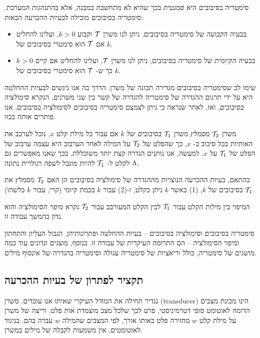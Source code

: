 {סימטריה בסיבובים היא
\emph{סמנטית}
בכך שהיא לא מתחשבת במבנה, אלא בהתנהגות המערכת.
סימטריה בסיבובים מובילה לבעיות ההכרעה הבאות:
\begin{itemize}
\item
בבעיה 
\emph{הקבועה}
של סימטריה בסיבובים, 
ניתן לנו משרן
$\mathcal{T}$ וקבוע $k>0$,
ועלינו להחליט אם
$\mathcal{T}$ 
הוא סימטרי בסיבובים של
$k$.
\item
בבעיה 
\emph{הקיומית}
של סימטריה בסיבובים, 
ניתן לנו משרן
$\mathcal{T}$,
ועלינו להחליט אם קיים
$k>0$
כך ש-
$\mathcal{T}$
הוא סימטרי בסיבובים של
$k$.
\end{itemize}

שימו לב שסימטריה בסיבובים מגדירה תכונה של משרן.
הדרך בה אנו ניגשים לבעיות ההחלטה היא על ידי תרגום ההגדרה של סימטריה להגדרה של קשר בין שני משרנים, הנקרא
\emph{סימולציה בסיבובים},
ואז, לאחר שנראה כי ניתן לצמצם סימטריה בסיבובים לסימולציה בסיבובים, אנו פותרים אותה ככזו.

משרן
$\mathcal{T}_2$
\emph{מסמלץ}
משרן
$\mathcal{T}_1$
\emph{בסיבובים של
$k$}
אם עבור כל מילת קלט
$x$, 
נוכל לערבב את האותיות בכל סיבוב ב-
$x$,
כך שהפלט של
$\mathcal{T}_2$
על המילה לאחר הערבוב היא עצמה ערבוב של הפלט של
$\mathcal{T}_1$
על
$x$.
למעשה, אנו נותנים הגדרה קצת יותר משוכללת, בכך שאנו מאפשרים גם לקלט ל-
$\mathcal{T}_1$
להיות מוגבל לשפה רגולרית נתונה
$\Lambda$.

בהתאם, בעיות ההכרעה הנוצרות מההגדרה של סימולציה בסיבובים הן האם 
$\mathcal{T}_2$
מסמלץ את
$\mathcal{T}_1$
בסיבובים של
$k$,
(1) כאשר
$k$
ניתן כקלט, ו-(2) עבור
$k$
בכמת קיומי (קרי, עבור
$k$
כלשהו).

המיפוי בין מילות הקלט עבור
$\mathcal{T}_1$
לבין הקלט המעורבב עבור
$\mathcal{T}_2$
נקרא
\emph{מיפוי הסימולציה}
והוא נדון בהמשך עבודה זו.

סימטריה בסיבובים וסימולציה בסיבובים 
\textenglish{--}
בעיות ההחלטה ופתרונותיהן, הגבול העליון והתחתון ומיפוי הסימולציה
\textenglish{--}
הם התרומה העיקרית של עבודה זו.
בנוסף, מוצגים ונדונים עוד כמה מושגים של סימטריה, כולל וריאציות של סימטריה עגולה וסימטריה בהגדרה של אינסוף מילים.

\subsection*{\texthebrew{תקציר לפתרון של בעיות ההכרעה}}

נגדיר תחילה את המודל העיקרי שאיתו אנו עובדים.
\emph{משרן}
(\textenglish{transducer})
הינו מכונת מצבים הדומה לאוטומט סופי דטרמיניסטי, פרט לכך שלכל מצב מוצמדת אות פלט, וריצה של משרן על מילת קלט
$w$
מחזירה פלט באותו אורך, לפי המצבים שהמילה
$w$
עברה בהם. בניגוד לאוטומטים, אין משמעות לקבלה של מילים במשרן.

}

